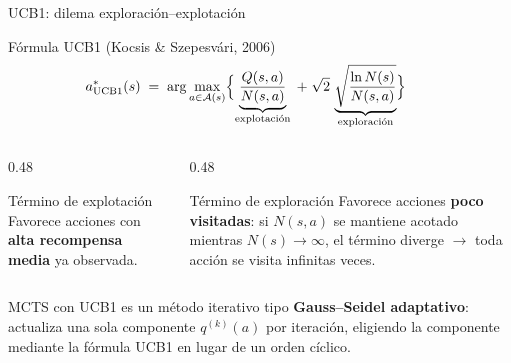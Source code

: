 \documentclass[aspectratio=169, 10pt]{beamer}
\begin{document}
\begin{frame}{UCB1: dilema exploración–explotación}
  \begin{block}{Fórmula UCB1 \footnotesize{(Kocsis \& Szepesvári, 2006)}}
    \[
      a^*_{\text{UCB1}}(s)
      \;=\;
      \arg\max_{a\in\mathcal{A}(s)}
      \Bigl\{
        \underbrace{\dfrac{Q(s,a)}{N(s,a)}}_{\text{explotación}}
        \;+\;
        \sqrt{2}\,\underbrace{\sqrt{\dfrac{\ln N(s)}{N(s,a)}}}_{\text{exploración}}
      \Bigr\}\hspace{2em}
    \]
  \end{block}

  \vspace{0.3cm}
  \begin{columns}[T]
    \begin{column}{0.48\textwidth}
      \begin{exampleblock}{Término de explotación}
        Favorece acciones con \textbf{alta recompensa media} ya observada.
      \end{exampleblock}
    \end{column}
    \begin{column}{0.48\textwidth}
      \begin{alertblock}{Término de exploración}
        Favorece acciones \textbf{poco visitadas}: si $N(s,a)$ se mantiene
        acotado mientras $N(s)\to\infty$, el término diverge
        $\to$ toda acción se visita infinitas veces.
      \end{alertblock}
    \end{column}
  \end{columns}

  \vspace{0.3cm}
  MCTS con UCB1 es un método iterativo tipo \textbf{Gauss–Seidel adaptativo}:
  actualiza una sola componente $q^{(k)}(a)$ por iteración,
  eligiendo la componente mediante la fórmula UCB1 en lugar de un orden cíclico.
\end{frame}
\end{document}
